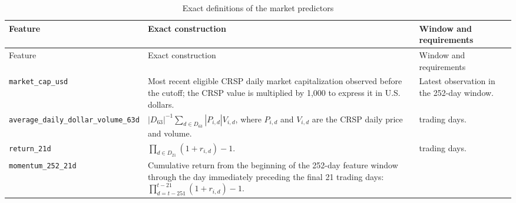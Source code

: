 \begingroup
\scriptsize
\setlength{\tabcolsep}{4pt}
\renewcommand{\arraystretch}{1.15}
\begin{longtable}{>{\raggedright\arraybackslash}p{}>{\raggedright\arraybackslash}p{}>{\raggedright\arraybackslash}p{}}
        \caption{Exact definitions of the market predictors}
        \label{tab:market-feature-definitions}                                                                                                                                                                         \\
        \toprule
        Feature & Exact construction                                                                                                                                                         & Window and requirements \\
        \midrule
        \endfirsthead
        \toprule
        Feature & Exact construction                                                                                                                                                         & Window and requirements \\
        \midrule
        \endhead
        \bottomrule
        \endfoot
        \nolinkurl{market_cap_usd}
                & Most recent eligible CRSP daily market capitalization observed before the cutoff; the CRSP value is multiplied by 1,000 to express it in U.S. dollars.
                & Latest observation in the 252-day window.                                                                                                                                                            \\
        \nolinkurl{average_daily_dollar_volume_63d}
                & $|D_{63}|^{-1}\sum_{d\in D_{63}}|P_{i,d}|V_{i,d}$, where $P_{i,d}$ and $V_{i,d}$ are the CRSP daily price and volume.
                & 63 trading days.                                                                                                                                                                                     \\
        \nolinkurl{return_21d}
                & $\prod_{d\in D_{21}}(1+r_{i,d})-1$.
                & 21 trading days.                                                                                                                                                                                     \\
        \nolinkurl{momentum_252_21d}
                & Cumulative return from the beginning of the 252-day feature window through the day immediately preceding the final 21 trading days: $\prod_{d=t-251}^{t-21}(1+r_{i,d})-1$.

\end{longtable}

